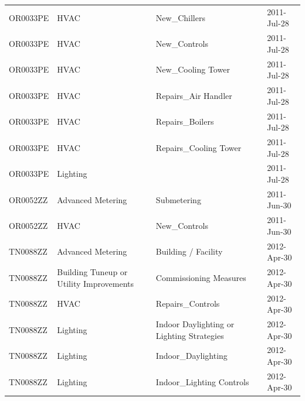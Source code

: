 \documentclass[12pt]{article}
\begin{document}
\begin{longtable}{lp{4cm}p{4cm}p{3cm}}
OR0033PE         & HVAC                                    & New\_Chillers                             & 2011-Jul-28                   \\
OR0033PE         & HVAC                                    & New\_Controls                             & 2011-Jul-28                   \\
OR0033PE         & HVAC                                    & New\_Cooling Tower                        & 2011-Jul-28                   \\
OR0033PE         & HVAC                                    & Repairs\_Air Handler                      & 2011-Jul-28                   \\
OR0033PE         & HVAC                                    & Repairs\_Boilers                          & 2011-Jul-28                   \\
OR0033PE         & HVAC                                    & Repairs\_Cooling Tower                    & 2011-Jul-28                   \\
OR0033PE         & Lighting                                &                                           & 2011-Jul-28                   \\
OR0052ZZ         & Advanced Metering                       & Submetering                               & 2011-Jun-30                   \\
OR0052ZZ         & HVAC                                    & New\_Controls                             & 2011-Jun-30                   \\
TN0088ZZ         & Advanced Metering                       & Building / Facility                       & 2012-Apr-30                   \\
TN0088ZZ         & Building Tuneup or Utility Improvements & Commissioning Measures                    & 2012-Apr-30                   \\
TN0088ZZ         & HVAC                                    & Repairs\_Controls                         & 2012-Apr-30                   \\
TN0088ZZ         & Lighting                                & Indoor Daylighting or Lighting Strategies & 2012-Apr-30                   \\
TN0088ZZ         & Lighting                                & Indoor\_Daylighting                       & 2012-Apr-30                   \\
TN0088ZZ         & Lighting                                & Indoor\_Lighting Controls                 & 2012-Apr-30                   \\

\end{longtable}
\end{document}
